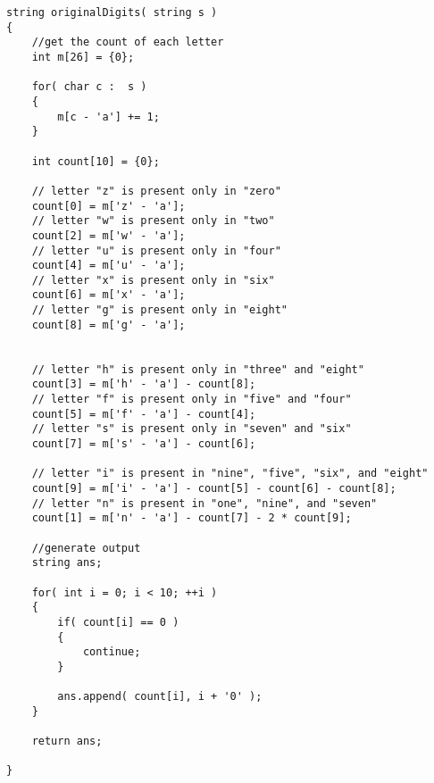 \setcounter{lstlisting}{0}
\begin{lstlisting}[style=customc, caption={Unique Letters Count}]
string originalDigits( string s )
{
    //get the count of each letter
    int m[26] = {0};

    for( char c :  s )
    {
        m[c - 'a'] += 1;
    }

    int count[10] = {0};

    // letter "z" is present only in "zero"
    count[0] = m['z' - 'a'];
    // letter "w" is present only in "two"
    count[2] = m['w' - 'a'];
    // letter "u" is present only in "four"
    count[4] = m['u' - 'a'];
    // letter "x" is present only in "six"
    count[6] = m['x' - 'a'];
    // letter "g" is present only in "eight"
    count[8] = m['g' - 'a'];


    // letter "h" is present only in "three" and "eight"
    count[3] = m['h' - 'a'] - count[8];
    // letter "f" is present only in "five" and "four"
    count[5] = m['f' - 'a'] - count[4];
    // letter "s" is present only in "seven" and "six"
    count[7] = m['s' - 'a'] - count[6];

    // letter "i" is present in "nine", "five", "six", and "eight"
    count[9] = m['i' - 'a'] - count[5] - count[6] - count[8];
    // letter "n" is present in "one", "nine", and "seven"
    count[1] = m['n' - 'a'] - count[7] - 2 * count[9];

    //generate output
    string ans;
	
    for( int i = 0; i < 10; ++i )
    {
        if( count[i] == 0 )
        {
            continue;
        }

        ans.append( count[i], i + '0' );
    }

    return ans;

}
\end{lstlisting}
